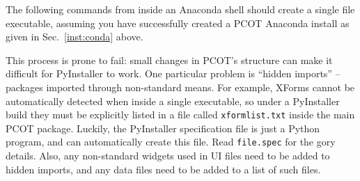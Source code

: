 The following commands from inside an Anaconda shell should create a single file executable, assuming you have successfully created
a PCOT Anaconda install as given in Sec.~\ref{inst:conda} above.
\vspace{1em}
\begin{paracol}{2}
\end{paracol}
This process is prone to fail: small changes in PCOT's structure can make it difficult for PyInstaller to work. One particular problem
is ``hidden imports'' -- packages imported through non-standard means. For example, XForms cannot be
automatically detected when inside a single executable, so under a PyInstaller build they must
be explicitly listed in a file called \texttt{xformlist.txt} inside the main PCOT
package. Luckily, the PyInstaller specification file is just a Python program, and can automatically create this file. Read \texttt{file.spec} for the gory details.
Also, any non-standard widgets used in UI files need to be added to hidden imports, and any data files need to be added to a list of
such files.

